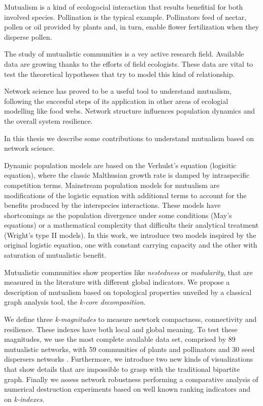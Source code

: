 \documentclass[
11pt, %
spanish, %
onehalfspacing, %
]{MastersDoctoralThesis_custom} %
\newcounter{theo}%
\begin{document}
\begin{declaration}
\addchaptertocentry{\authorshipname}

Mutualism is a kind of ecologocial interaction that results benefitial for both involved species. Pollination is the typical example. Pollinators feed of nectar, pollen or oil provided by plants and, in turn, enable flower fertilization when they disperse pollen.   

The study of mutualistic communities is a vey active research field. Available data are growing thanks to the efforts of field ecologists. These data are vital to test the theoretical hypotheses that try to model this kind of relationship.

Network science has proved to be a useful tool to understand mutualism, following the succesful steps of its application in other areas of ecologial modelling like food webs. Network structure influences population dynamics and the overall system resilience. 

In this thesis we describe some contributions to understand mutualism based on network science. 

Dynamic population models are based on the Verhulst’s equation (logisitic equation), where the classic Malthusian growth rate is damped by intraspecific competition terms. Mainstream population models for mutualism are modifications of the logistic equation with additional terms to account for the benefits produced by the interspecies interactions. These models have shortcomings as the population divergence under some conditions (May’s equations) or a mathematical complexity that difficults their analytical treatment
(Wright’s type II models). In this work, we introduce two models inspired by the original logistic equation, one with constant carrying capacity and the other with saturation of mutualistic benefit.

Mutualistic communities show properties like \textit{nestedness} or \textit{modularity}, that are measured in the literature with different global indicators. We propose a description of mutualism based on topological properties unveiled by a classical graph analysis tool, the \textit{k-core decomposition}.

We define three \textit{k-magnitudes} to measure newtork compactness, connectivity and resilience. These indexes have both local and global meaning. To test these magnitudes, we use the most complete
available data set, comprised by 89 mutualistic networks, with 59 communities of plants
and pollinators and 30 seed dispersers networks . Furthermore, we introduce two
new kinds of visualizations that show details that are impossible to grasp with
the traditional bipartite graph. Finally we assess network robustness performing a comparative analysis of numerical destruction experiments based on well known ranking indicators and on \textit{k-indexes}.

\end{declaration}
\end{document}
